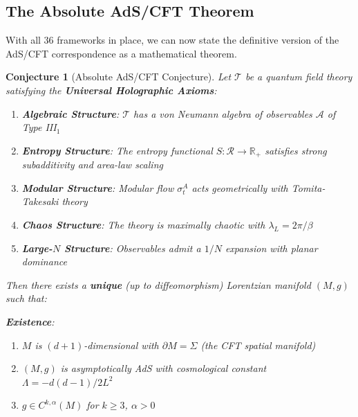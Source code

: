 \documentclass[12pt,a4paper]{article}
\newtheorem{conjecture}[theorem]{Conjecture}
\begin{document}
\subsection{The Absolute AdS/CFT Theorem}
\label{subsec:absolute-theorem}

With all 36 frameworks in place, we can now state the definitive version of the AdS/CFT correspondence as a mathematical theorem.

\begin{conjecture}[Absolute AdS/CFT Conjecture]\label{thm:absolute-adscft}
Let $\mathcal{T}$ be a quantum field theory satisfying the \textbf{Universal Holographic Axioms}:
\begin{enumerate}
    \item[\textbf{(U1)}] \textbf{Algebraic Structure}: $\mathcal{T}$ has a von Neumann algebra of observables $\mathcal{A}$ of Type III$_1$
    \item[\textbf{(U2)}] \textbf{Entropy Structure}: The entropy functional $S: \mathcal{R} \to \mathbb{R}_+$ satisfies strong subadditivity and area-law scaling
    \item[\textbf{(U3)}] \textbf{Modular Structure}: Modular flow $\sigma_t^A$ acts geometrically with Tomita-Takesaki theory
    \item[\textbf{(U4)}] \textbf{Chaos Structure}: The theory is maximally chaotic with $\lambda_L = 2\pi/\beta$
    \item[\textbf{(U5)}] \textbf{Large-$N$ Structure}: Observables admit a $1/N$ expansion with planar dominance
\end{enumerate}

Then there exists a \textbf{unique} (up to diffeomorphism) Lorentzian manifold $(M, g)$ such that:

\textbf{Existence}:
\begin{enumerate}
    \item $M$ is $(d+1)$-dimensional with $\partial M = \Sigma$ (the CFT spatial manifold)
    \item $(M, g)$ is asymptotically AdS with cosmological constant $\Lambda = -d(d-1)/2L^2$
    \item $g \in C^{k,\alpha}(M)$ for $k \geq 3$, $\alpha > 0$
\end{enumerate}


\end{conjecture}
\end{document}
